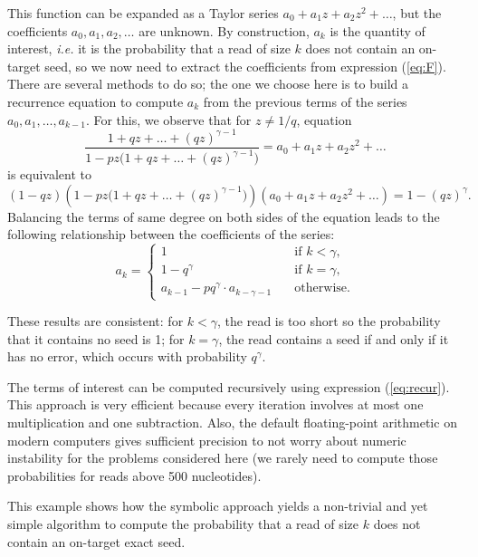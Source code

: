 \documentclass{article}
\begin{document}
This function can be expanded as a Taylor series $a_0 + a_1z + a_2z^2 +
\ldots$, but the coefficients $a_0, a_1, a_2, \ldots$ are unknown. By
construction, $a_k$ is the quantity of interest, \textit{i.e.} it is the
probability that a read of size $k$ does not contain an on-target seed, so
we now need to extract the coefficients from expression (\ref{eq:F}).
There are several methods to do so; the one we choose here is to build a
recurrence equation to compute $a_k$ from the previous terms of the series
$a_0, a_1, \ldots, a_{k-1}$. For this, we observe that for $z \neq 1/q$,
equation
\begin{equation*}
\frac{1+qz+\ldots+(qz)^{\gamma-1}}
  {1-pz \big(1+qz+\ldots+(qz)^{\gamma-1} \big)} =
  a_0 + a_1z +a_2z^2 + \ldots
\end{equation*}
is equivalent to
\begin{equation*}
(1-qz) \left(1-pz \big(1+qz+\ldots+(qz)^{\gamma-1} \big)\right)
(a_0 + a_1z +a_2z^2 + \ldots) = 1-(qz)^\gamma.
\end{equation*}
Balancing the terms of same degree on both sides of the equation leads
to the following relationship between the coefficients of the series:
\begin{equation}
\label{eq:recur}
a_k = 
\begin{cases}
1            &\quad\text{if } k < \gamma, \\
1 -q^\gamma &\quad\text{if } k = \gamma, \\
a_{k-1} -pq^\gamma \cdot a_{k-\gamma-1} &\quad\text{otherwise.}
\end{cases}
\end{equation}

These results are consistent: for $k < \gamma$, the read is too short so
the probability that it contains no seed is 1; for $k = \gamma$, the
read contains a seed if and only if it has no error, which occurs with
probability $q^\gamma$.

The terms of interest can be computed recursively using expression
(\ref{eq:recur}). This approach is very efficient because every iteration
involves at most one multiplication and one subtraction. Also, the default
floating-point arithmetic on modern computers gives sufficient precision
to not worry about numeric instability for the problems considered here
(we rarely need to compute those probabilities for reads above 500
nucleotides).

This example shows how the symbolic approach yields a non-trivial and yet
simple algorithm to compute the probability that a read of size $k$ does
not contain an on-target exact seed.
\end{document}
